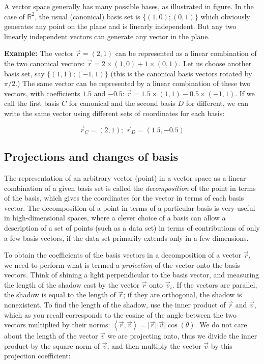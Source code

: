 \documentclass[
  letterpaper,
  DIV=11,
  numbers=noendperiod]{scrreprt}
\begin{document}
A vector space generally has many possible bases, as illustrated in
figure. In the case of \(\mathbb{R}^2\), the usual (canonical) basis set
is \(\{(1,0); (0,1)\}\) which obviously generates any point on the plane
and is linearly independent. But any two linearly independent vectors
can generate any vector in the plane.

\textbf{Example:} The vector \(\vec r = (2,1)\) can be represented as a
linear combination of the two canonical vectors:
\(\vec r = 2\times (1,0)+1\times (0,1)\). Let us choose another basis
set, say \(\{(1,1); (-1,1)\}\) (this is the canonical basis vectors
rotated by \(\pi/2\).) The same vector can be represented by a linear
combination of these two vectors, with coefficients \(1.5\) and
\(-0.5\): \(\vec r = 1.5\times (1,1) - 0.5 \times (-1,1)\). If we call
the first basis \(C\) for canonical and the second basis \(D\) for
different, we can write the same vector using different sets of
coordinates for each basis:

\[ 
\vec r_{C} = (2,1); \; \vec r_D = (1.5, -0.5)
\]

\hypertarget{projections-and-changes-of-basis}{%
\subsection{Projections and changes of
basis}\label{projections-and-changes-of-basis}}

The representation of an arbitrary vector (point) in a vector space as a
linear combination of a given basis set is called the
\emph{decomposition} of the point in terms of the basis, which gives the
coordinates for the vector in terms of each basis vector. The
decomposition of a point in terms of a particular basis is very useful
in high-dimensional spaces, where a clever choice of a basis can allow a
description of a set of points (such as a data set) in terms of
contributions of only a few basis vectors, if the data set primarily
extends only in a few dimensions.

To obtain the coefficients of the basis vectors in a decomposition of a
vector \(\vec r\), we need to perform what is termed a \emph{projection}
of the vector onto the basis vectors. Think of shining a light
perpendicular to the basis vector, and measuring the length of the
shadow cast by the vector \(\vec r\) onto \(\vec v_i\). If the vectors
are parallel, the shadow is equal to the length of \(\vec r\); if they
are orthogonal, the shadow is nonexistent. To find the length of the
shadow, use the inner product of \(\vec r\) and \(\vec v\), which as you
recall corresponds to the cosine of the angle between the two vectors
multiplied by their norms:
\(\left\langle \vec r, \vec v\right \rangle =\vert\vec r\vert \vert\vec v\vert\cos(\theta)\).
We do not care about the length of the vector \(\vec v\) we are
projecting onto, thus we divide the inner product by the square norm of
\(\vec v\), and then multiply the vector \(\vec v\) by this projection
coefficient:
\end{document}
